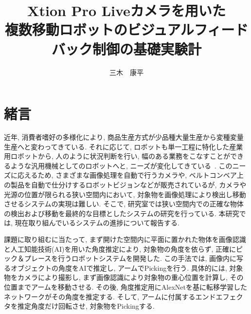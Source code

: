 \documentclass{suribt}
\title{\huge Xtion Pro Liveカメラを用いた\\複数移動ロボットのビジュアルフィードバック制御の基礎実験計}
\author{三木　康平}
\begin{document}
\maketitle %
\frontmatter %
\begin{abstract}%




\end{abstract}
\tableofcontents%
\mainmatter%
\chapter{緒言}
近年, 消費者嗜好の多様化により, 商品生産方式が少品種大量生産から変種変量生産へと変わってきている. それに応じて, ロボットも単一工程に特化した産業用ロボットから, 人のように状況判断を行い, 幅のある業務をこなすことができるような汎用機械としてのロボットへと, ニーズが変化してきている~\cite{Iziri-2019}. このニーズに応えるため, さまざまな画像処理を自動で行うカメラや, ベルトコンベア上の製品を自動で仕分けするロボットビジョンなどが販売されているが, カメラや光源の位置が限られる狭い空間内において, 対象物を画像処理により検出し移動させるシステムの実現は難しい. そこで, 研究室では狭い空間内での正確な物体の検出および移動を最終的な目標としたシステムの研究を行っている. 本研究では, 現在取り組んでいるシステムの進捗について報告する. 

課題に取り組むに当たって, まず開けた空間内に平面に置かれた物体を画像認識と人工知能技術(AI)を用いた角度推定により, 対象物の角度を依らず, 正確にピック＆プレースを行うロボットシステムを開発した. この手法では, 画像内に写るオブジェクトの角度をAIで推定し, アームでPickingを行う. 具体的には, 対象物をカメラにより撮影し, まず画像認識により対象物の重心位置を計算し, その位置までアームを移動させる. その後, 角度推定用にAlexNetを基に転移学習したネットワークがその角度を推定する. そして, アームに付属するエンドエフェクタを推定角度だけ回転させ, 対象物をPickingする. 
\end{document}
